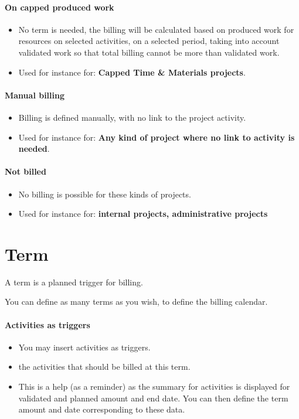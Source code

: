 \documentclass[letterpaper,10pt,english]{sphinxmanual}
\begin{document}
\paragraph{On capped produced work}
\begin{itemize}
\item {} 
No term is needed, the billing will be calculated based on produced work for resources on selected activities, on a selected period, taking into account validated work so that total billing cannot be more than validated work.

\item {} 
Used for instance for: \textbf{Capped Time \& Materials projects}.

\end{itemize}
\paragraph{Manual billing}
\begin{itemize}
\item {} 
Billing is defined manually, with no link to the project activity.

\item {} 
Used for instance for: \textbf{Any kind of project where no link to activity is needed}.

\end{itemize}
\paragraph{Not billed}
\begin{itemize}
\item {} 
No billing is possible for these kinds of projects.

\item {} 
Used for instance for: \textbf{internal projects, administrative projects}

\end{itemize}
\newpage
{}

\section{Term}
\label{Bill:term}\label{Bill:index-2}
A term is a planned trigger for billing.

You can define as many terms as you wish, to define the billing calendar.
\paragraph{Activities as triggers}
\begin{itemize}
\item {} 
You may insert activities as triggers.

\item {} 
the activities that should be billed at this term.

\item {} 
This is a help (as a reminder) as the summary for activities is displayed for validated and planned amount and end date. You can then define the term amount and date corresponding to these data.

\end{itemize}
\end{document}
